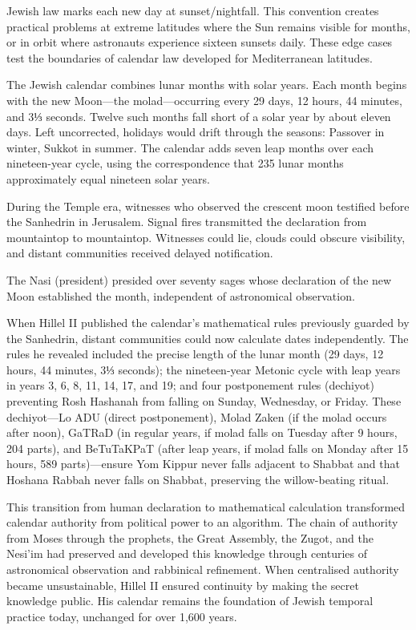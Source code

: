 Jewish law marks each new day at sunset/nightfall. This convention creates practical problems at extreme latitudes where the Sun remains visible for months, or in orbit where astronauts experience sixteen sunsets daily. These edge cases test the boundaries of calendar law developed for Mediterranean latitudes.

The Jewish calendar combines lunar months with solar years. Each month begins with the new Moon—the molad—occurring every 29 days, 12 hours, 44 minutes, and 3⅓ seconds. Twelve such months fall short of a solar year by about eleven days. Left uncorrected, holidays would drift through the seasons: Passover in winter, Sukkot in summer. The calendar adds seven leap months over each nineteen-year cycle, using the correspondence that 235 lunar months approximately equal nineteen solar years.

During the Temple era, witnesses who observed the crescent moon testified before the Sanhedrin in Jerusalem. Signal fires transmitted the declaration from mountaintop to mountaintop. Witnesses could lie, clouds could obscure visibility, and distant communities received delayed notification.

The Nasi (president) presided over seventy sages whose declaration of the new Moon established the month, independent of astronomical observation.

When Hillel II published the calendar's mathematical rules previously guarded by the Sanhedrin, distant communities could now calculate dates independently. The rules he revealed included the precise length of the lunar month (29 days, 12 hours, 44 minutes, 3⅓ seconds); the nineteen-year Metonic cycle with leap years in years 3, 6, 8, 11, 14, 17, and 19; and four postponement rules (dechiyot) preventing Rosh Hashanah from falling on Sunday, Wednesday, or Friday. These dechiyot—Lo ADU (direct postponement), Molad Zaken (if the molad occurs after noon), GaTRaD (in regular years, if molad falls on Tuesday after 9 hours, 204 parts), and BeTuTaKPaT (after leap years, if molad falls on Monday after 15 hours, 589 parts)—ensure Yom Kippur never falls adjacent to Shabbat and that Hoshana Rabbah never falls on Shabbat, preserving the willow-beating ritual.

This transition from human declaration to mathematical calculation transformed calendar authority from political power to an algorithm. The chain of authority from Moses through the prophets, the Great Assembly, the Zugot, and the Nesi'im had preserved and developed this knowledge through centuries of astronomical observation and rabbinical refinement. When centralised authority became unsustainable, Hillel II ensured continuity by making the secret knowledge public. His calendar remains the foundation of Jewish temporal practice today, unchanged for over 1,600 years.

